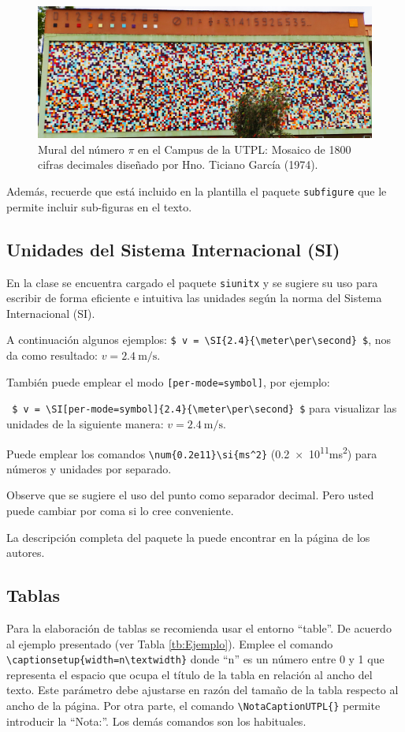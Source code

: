 \begin{figure}[h!]
	\centering
	\captionsetup{width=0.9\textwidth}
	\caption{Mural del número $ \pi $ en el Campus de la UTPL: Mosaico de 1800 cifras decimales diseñado por Hno. Ticiano García (1974).}
	\label{fig:utplcruz2}
	\includegraphics[width=0.9\linewidth]{FIGURES/UTPL_MuralPi}
\end{figure}

\vspace{-1cm}
Además, recuerde que está incluido en la plantilla el paquete \texttt{subfigure} que le permite incluir sub-figuras en el texto. 


\subsection{Unidades del Sistema Internacional (SI)}
En la clase se encuentra cargado el paquete \lstinline|siunitx| y se sugiere su uso para escribir de forma eficiente e intuitiva las unidades  según la norma del Sistema Internacional (SI). 

A continuación algunos ejemplos: 
\lstinline|$ v = \SI{2.4}{\meter\per\second} $|, nos da como resultado: $ v = \SI{2.4}{\meter\per\second} $. 

También puede emplear el modo \lstinline|[per-mode=symbol]|, por ejemplo:

\lstinline| $ v = \SI[per-mode=symbol]{2.4}{\meter\per\second} $| para visualizar las unidades de la siguiente manera: $ v = \SI[per-mode=symbol]{2.4}{\meter\per\second} $. 

Puede emplear los comandos \lstinline|\num{0.2e11}\si{ms^2}| (\num{0.2e11}\si{ms^2}) para números y unidades por separado. 

Observe que se sugiere el uso del punto como separador decimal. Pero usted puede cambiar por coma si lo cree conveniente.

La descripción completa del paquete la puede encontrar en la página de los autores. 


\subsection{Tablas}
Para la elaboración de tablas se recomienda usar el entorno ``table''. De acuerdo al ejemplo presentado (ver Tabla \ref{tb:Ejemplo}). Emplee el comando \lstinline|\captionsetup{width=n\textwidth}| donde ``n'' es un número entre 0 y 1 que representa el espacio que ocupa el título de la tabla en relación al ancho del texto. Este parámetro debe ajustarse en razón del tamaño de la tabla respecto al ancho de la página. Por otra parte, el comando \lstinline|\NotaCaptionUTPL{}| permite introducir la ``Nota:''. Los demás comandos son los habituales. 


